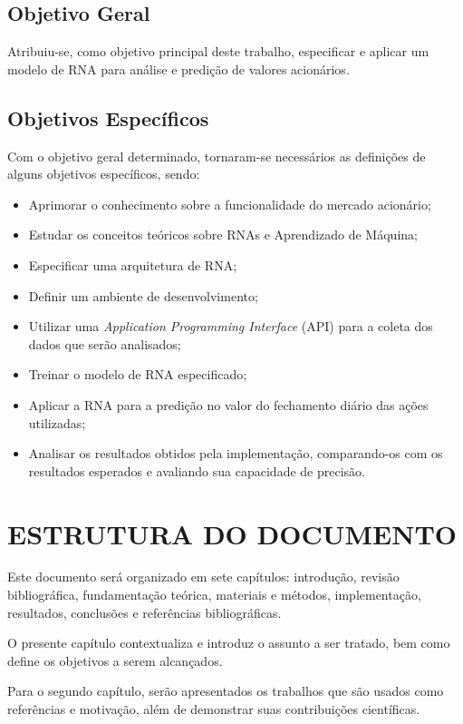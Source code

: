 \subsection{Objetivo Geral} 
Atribuiu-se, como objetivo principal deste trabalho, especificar e aplicar um modelo de RNA para análise e predição de valores acionários.

\subsection{Objetivos Específicos}\label{subsec:objetivos_especificos}
Com o objetivo geral determinado, tornaram-se necessários as definições de alguns objetivos específicos, sendo:
\begin{itemize}
	\item Aprimorar o conhecimento sobre a funcionalidade do mercado acionário;
	\item Estudar os conceitos teóricos sobre RNAs e Aprendizado de Máquina;
	\item Especificar uma arquitetura de RNA;
	\item Definir um ambiente de desenvolvimento;
	\item Utilizar uma \textit{Application Programming Interface} (API) para a coleta dos dados que serão analisados;
	\item Treinar o modelo de RNA especificado;
	\item Aplicar a RNA para a predição no valor do fechamento diário das ações utilizadas;
	\item Analisar os resultados obtidos pela implementação, comparando-os com os resultados esperados e avaliando sua capacidade de precisão.
\end{itemize}

\section{ESTRUTURA DO DOCUMENTO}\label{sec:organizacao-trabalho}
Este documento será organizado em sete capítulos: introdução, revisão bibliográfica, fundamentação teórica, materiais e métodos, implementação, resultados, conclusões e referências bibliográficas.

O presente capítulo contextualiza e introduz o assunto a ser tratado, bem como define os objetivos a serem alcançados.

Para o segundo capítulo, serão apresentados os trabalhos que são usados como referências e motivação, além de demonstrar suas contribuições científicas.


